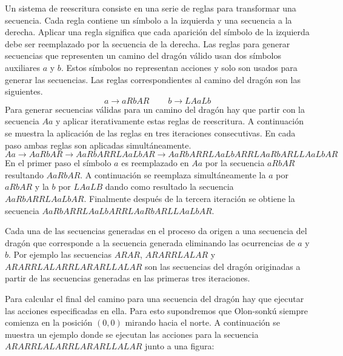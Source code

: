 \documentclass{oci}
\begin{document}
Un sistema de reescritura consiste en una serie de reglas para transformar una secuencia.
Cada regla contiene un símbolo a la izquierda y una secuencia a la derecha.
Aplicar una regla significa que cada aparición del símbolo de la izquierda debe ser reemplazado por la secuencia de la derecha.
Las reglas para generar secuencias que representen un camino del dragón válido usan dos símbolos auxiliares $a$ y $b$.
Estos símbolos no representan acciones y solo son usados para generar las secuencias.
Las reglas correspondientes al camino del dragón son las siguientes.
$$a \rightarrow aRbAR \ \ \ \ \ \ \ \ \ \   b \rightarrow LAaLb$$
Para generar secuencias válidas para un camino del dragón hay que partir con la secuencia $Aa$ y aplicar iterativamente estas reglas de reescritura.
A continuación se muestra la aplicación de las reglas en tres iteraciones consecutivas.
En cada paso ambas reglas son aplicadas simultáneamente.
$$Aa \rightarrow AaRbAR \rightarrow AaRbARRLAaLbAR \rightarrow AaRbARRLAaLbARRLAaRbARLLAaLbAR$$
En el primer paso el símbolo $a$ es reemplazado en $Aa$ por la secuencia $aRbAR$ resultando $AaRbAR$.
A continuación se reemplaza simultáneamente la $a$ por $aRbAR$ y la $b$ por $LAaLB$ dando como resultado la secuencia $AaRbARRLAaLbAR$.
Finalmente después de la tercera iteración se obtiene la secuencia $AaRbARRLAaLbARRLAaRbARLLAaLbAR$.

Cada una de las secuencias generadas en el proceso da origen a una secuencia del dragón que corresponde a la secuencia generada eliminando las ocurrencias de $a$ y $b$.
Por ejemplo las secuencias $ARAR$, $ARARRLALAR$ y $ARARRLALARRLARARLLALAR$ son las secuencias del dragón originadas a partir de las secuencias generadas en las primeras tres iteraciones.

Para calcular el final del camino para una secuencia del dragón hay que ejecutar las acciones especificadas en ella.
Para esto supondremos que Olon-sonkú siempre comienza en la posición $(0,0)$ mirando hacia el norte.
A continuación se muestra un ejemplo donde se ejecutan las acciones para la secuencia $ARARRLALARRLARARLLALAR$ junto a una figura:
\\
\end{document}
